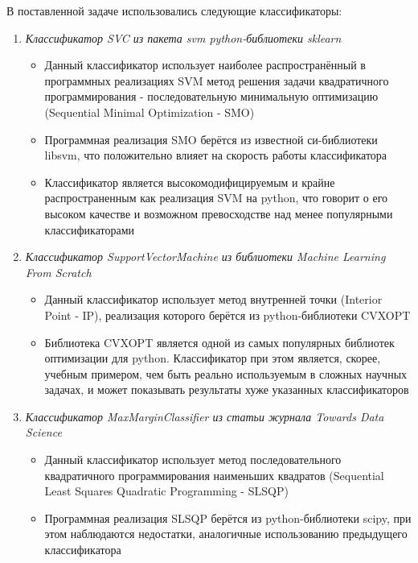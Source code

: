 В поставленной задаче использовались следующие классификаторы:
\begin{enumerate}
    \item \textit{Классификатор SVC из пакета svm python-библиотеки sklearn}
        \begin{itemize}
            \item Данный классификатор использует наиболее распространённый в программных реализациях SVM метод решения задачи квадратичного программирования - последовательную минимальную оптимизацию (Sequential Minimal Optimization - SMO)
            \item Программная реализация SMO берётся из известной си-библиотеки libsvm, что положительно влияет на скорость работы классификатора
            \item Классификатор является высокомодифицируемым и крайне распространенным как реализация SVM на python, что говорит о его высоком качестве и возможном превосходстве над менее популярными классификаторами
        \end{itemize}
    \item \textit{Классификатор SupportVectorMachine из библиотеки Machine Learning From Scratch}
        \begin{itemize}
            \item Данный классификатор использует метод внутренней точки (Interior Point - IP), реализация которого берётся из python-библиотеки CVXOPT
            \item Библиотека CVXOPT является одной из самых популярных библиотек оптимизации для python. Классификатор при этом является, скорее, учебным примером, чем быть реально используемым в сложных научных задачах, и может показывать результаты хуже указанных классификаторов
        \end{itemize}
    \item \textit{Классификатор MaxMarginClassifier из статьи журнала Towards Data Science}
        \begin{itemize}
            \item Данный классификатор использует метод последовательного квадратичного программирования наименьших квадратов (Sequential Least Squares Quadratic Programming - SLSQP)
            \item Программная реализация SLSQP берётся из python-библиотеки scipy, при этом наблюдаются недостатки, аналогичные использованию предыдущего классификатора
        \end{itemize}
\end{enumerate}

